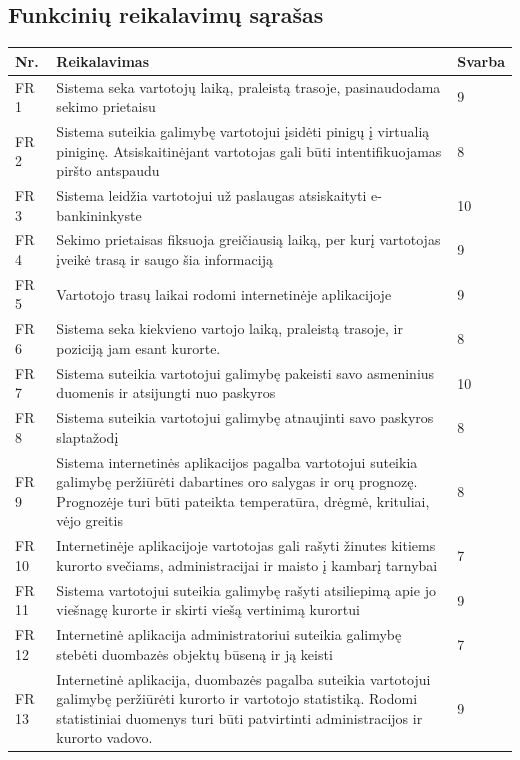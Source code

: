 \documentclass[oneside]{VUMIFPSkursinis}
\begin{document}
\subsection{Funkcinių reikalavimų sąrašas}
\begin{longtable}{ | p{}|p{}|p{}| }  \hline
	Nr. & Reikalavimas &  Svarba   \\ \hline
	FR 1 & Sistema seka vartotojų laiką, praleistą trasoje, pasinaudodama sekimo prietaisu & 9 \\ \hline
	FR 2 & Sistema suteikia galimybę vartotojui įsidėti pinigų į virtualią piniginę. Atsiskaitinėjant vartotojas gali būti intentifikuojamas piršto antspaudu & 8 \\ \hline
	FR 3 & Sistema leidžia vartotojui už paslaugas atsiskaityti e-bankininkyste & 10 \\ \hline
	FR 4 & Sekimo prietaisas fiksuoja greičiausią laiką, per kurį vartotojas įveikė trasą ir saugo šia informaciją & 9 \\ \hline
	FR 5 & Vartotojo trasų laikai rodomi internetinėje aplikacijoje & 9 \\ \hline
	FR 6 & Sistema seka kiekvieno vartojo laiką, praleistą trasoje, ir poziciją jam esant kurorte.   & 8 \\ \hline
	FR 7 &  Sistema suteikia vartotojui galimybę pakeisti savo asmeninius duomenis ir atsijungti nuo paskyros& 10\\ \hline
	FR 8 & Sistema suteikia vartotojui galimybę atnaujinti savo paskyros slaptažodį & 8\\ \hline
	FR 9 & Sistema internetinės aplikacijos pagalba vartotojui suteikia galimybę peržiūrėti dabartines oro salygas ir orų prognozę. Prognozėje turi būti pateikta temperatūra, drėgmė, krituliai, vėjo greitis  & 8 \\ \hline
	FR 10 & Internetinėje aplikacijoje vartotojas gali rašyti žinutes kitiems kurorto svečiams, administracijai ir maisto į kambarį tarnybai & 7 \\ \hline
	FR 11 & Sistema vartotojui suteikia galimybę rašyti atsiliepimą apie jo viešnagę kurorte ir skirti viešą vertinimą kurortui & 9 \\ \hline
	FR 12 & Internetinė aplikacija administratoriui suteikia galimybę stebėti duombazės objektų būseną ir ją keisti & 7 \\ \hline
	FR 13 & Internetinė aplikacija, duombazės pagalba suteikia vartotojui galimybę peržiūrėti kurorto ir vartotojo statistiką. Rodomi statistiniai duomenys turi būti patvirtinti administracijos ir kurorto vadovo. & 9 \\ \hline

\end{longtable}
\end{document}
